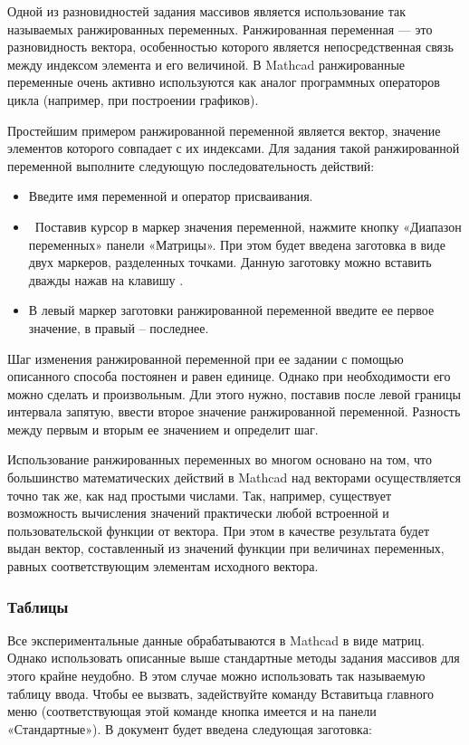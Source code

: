 
Одной из разновидностей задания массивов является использование так называемых ранжированных переменных. Ранжированная переменная --- это разновидность вектора, особенностью которого является непосредственная связь между индексом элемента и его величиной. В Mathcad ранжированные переменные очень активно используются как аналог программных операторов цикла (например, при построении графиков).

Простейшим примером ранжированной переменной является вектор, значение элементов которого совпадает с их индексами. Для задания такой ранжированной переменной выполните следующую последовательность действий:
\begin{itemize}
	\item Введите имя переменной и оператор присваивания.
	\item  Поставив курсор в маркер значения переменной, нажмите кнопку «Диапазон переменных» панели «Матрицы». При этом будет введена заготовка в виде двух маркеров, разделенных точками.	Данную заготовку можно вставить дважды нажав на клавишу .
	\item В левый  маркер заготовки ранжированной переменной введите ее первое значение, в правый – последнее.
\end{itemize}

Шаг изменения ранжированной переменной при ее задании с помощью описанного способа постоянен и равен единице. Однако при необходимости его можно сделать и произвольным. Дли этого нужно, поставив после левой границы интервала запятую, ввести второе значение ранжированной переменной. Разность между первым и вторым ее значением и определит шаг. 

Использование ранжированных переменных во многом основано на том, что большинство математических действий в Mathcad над векторами осуществляется точно так же, как над простыми числами. Так, например, существует возможность вычисления значений практически любой встроенной и пользовательской функции от вектора. При этом в качестве результата будет выдан вектор, составленный из значений функции при величинах переменных, равных соответствующим элементам исходного вектора.

\subsubsection*{Таблицы}
Все экспериментальные данные обрабатываются в Mathcad в виде матриц. Однако использовать описанные выше стандартные методы задания массивов для этого крайне неудобно. В этом случае можно использовать так называемую таблицу ввода. Чтобы ее вызвать, задействуйте команду Вставитьца главного меню (соответствующая этой команде кнопка имеется и на панели «Стандартные»). В документ будет введена следующая заготовка:



